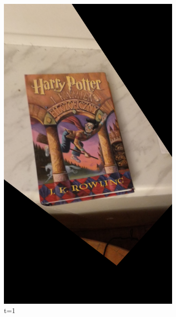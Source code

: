 \documentclass{article}
\begin{document}
	\begin{figure}[H]
		\centering
		\begin{subfigure}[b]{0.3\linewidth}
			\includegraphics[width=\linewidth]{p1t.png}
			\caption{t=1}
		\end{subfigure}
		\begin{subfigure}[b]{0.3\linewidth}

\end{subfigure}
\end{figure}
\end{document}
